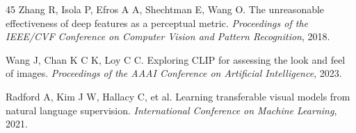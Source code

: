 \documentclass[times,twocolumn,final]{elsarticle}
\providecommand{\DIFadd}[1]{{\protect\color{blue} \sf #1}} %
\providecommand{\DIFaddend}{} %
\DeclareRobustCommand{\DIFaddend}{\DIFOaddend \let\includegraphics\DIFOincludegraphics} %
\begin{document}
\begin{thebibliography}{45}
\DIFadd{Zhang R, Isola P, Efros A A, Shechtman E, Wang O. The unreasonable effectiveness of deep features as a perceptual metric. \textit{Proceedings of the IEEE/CVF Conference on Computer Vision and Pattern Recognition}, 2018.
}

\DIFadd{Wang J, Chan K C K, Loy C C. Exploring CLIP for assessing the look and feel of images. \textit{Proceedings of the AAAI Conference on Artificial Intelligence}, 2023.
}

\DIFadd{Radford A, Kim J W, Hallacy C, et al. Learning transferable visual models from natural language supervision. \textit{International Conference on Machine Learning}, 2021.
}\DIFaddend

\end{thebibliography}
\end{document}

